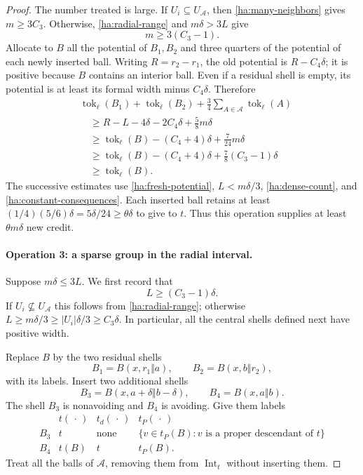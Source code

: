 \begin{proof}
The number treated is large.  If $U_i\subseteq U_{\mathcal A}$, then
\eqref{ha:many-neighbors} gives $m\geq3C_3$.  Otherwise,
\eqref{ha:radial-range} and $m\delta>3L$ give
\begin{equation}
 m\geq3(C_3-1).
 \label{ha:dense-count}
\end{equation}
Allocate to $B$ all the potential of $B_1,B_2$ and three quarters of
the potential of each newly inserted ball.  Writing $R=r_2-r_1$,
the old potential is $R-C_4\delta$; it is positive because $B$
contains an interior ball.  Even if a residual shell is empty, its
potential is at least its formal width minus $C_4\delta$.  Therefore
\begin{align*}
 &\operatorname{tok}_\ell(B_1)+\operatorname{tok}_\ell(B_2)
       +\frac34\sum_{A\in\mathcal A}\operatorname{tok}_\ell(A)\\
 &\quad\geq R-L-4\delta-2C_4\delta+\frac58m\delta\\
 &\quad\geq\operatorname{tok}_\ell(B)
                -(C_4+4)\delta+\frac7{24}m\delta\\
 &\quad\geq\operatorname{tok}_\ell(B)
                -(C_4+4)\delta+\frac78(C_3-1)\delta\\
 &\quad\geq\operatorname{tok}_\ell(B).
\end{align*}
The successive estimates use \eqref{ha:fresh-potential},
$L<m\delta/3$, \eqref{ha:dense-count}, and
\eqref{ha:constant-consequences}.  Each inserted ball retains at least
$(1/4)(5/6)\delta=5\delta/24\geq\theta\delta$ to give to $t$.
Thus this operation supplies at least $\theta m\delta$ new credit.

\paragraph{\textbf{Operation 3: a sparse group in the radial interval.}}
Suppose $m\delta\leq3L$.  We first record that
\begin{equation}
 L\geq(C_3-1)\delta.
 \label{ha:sparse-width}
\end{equation}
If $U_i\not\subseteq U_{\mathcal A}$ this follows from
\eqref{ha:radial-range}; otherwise
$L\geq m\delta/3\geq|U_i|\delta/3\geq C_3\delta$.
In particular, all the central shells defined next have positive width.

Replace $B$ by the two residual shells
\[
 B_1=B(x,r_1\Vert a),\qquad B_2=B(x,b\Vert r_2),
\]
with its labels.  Insert two additional shells
\[
 B_3=B(x,a+\delta\Vert b-\delta),\qquad
 B_4=B(x,a\Vert b).
\]
The shell $B_3$ is nonavoiding and $B_4$ is avoiding.  Give them labels
\begin{equation}
 \begin{array}{c|ccc}
    &t(\,\cdot\,)&t_d(\,\cdot\,)&t_P(\,\cdot\,)\\ \hline
 B_3&t&\text{none}&
             \{v\in t_P(B):v\text{ is a proper descendant of }t\}\\
 B_4&t(B)&t&t_P(B).
 \end{array}
 \label{ha:central-labels}
\end{equation}
Treat all the balls of $\mathcal A$, removing them from
$\operatorname{Int}_t$ without inserting them.


\end{proof}
